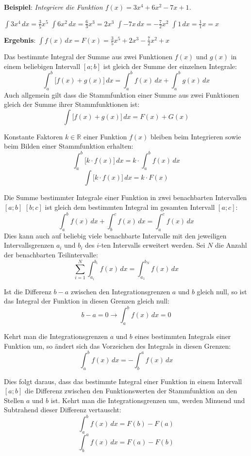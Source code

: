 \textbf{Beispiel}: \emph{Integriere die Funktion $f(x) = 3x^4 + 6x^2 -7x + 1$.}

\begin{center}
	$\int 3x^4 \, dx = \frac{3}{5}x^5$ \hspace{1cm} $\int 6x^2 \, dx = \frac{6}{3}x^3 = 2x^3$ \hspace{1cm} $\int -7x \, dx = -\frac{7}{2}x^2$ \hspace{1cm} $\int 1 \, dx = \frac{1}{1}x = x$
\end{center}

\textbf{Ergebnis}: $\int f(x) \, dx = F(x) = \frac{3}{5}x^5 + 2x^3 -\frac{7}{2}x^2 + x$

\begin{itemize}

	Das bestimmte Integral der Summe aus zwei Funktionen $f(x)$ und $g(x)$ in einem beliebigen Intervall $[a ; b]$ ist gleich der Summe der einzelnen Integrale: $$\int_a^b \big[f(x) + g(x)\big] \,dx = \int_a^b f(x) \, dx + \int_a^b g(x) \, dx$$ Auch allgemein gilt dass die Stammfunktion einer Summe aus zwei Funktionen gleich der Summe ihrer Stammfunktionen ist: $$\int \big[f(x) + g(x)\big]\,dx = F(x) + G(x)$$


	Konstante Faktoren $k \in \mathbb{R}$ einer Funktion $f(x)$ bleiben beim Integrieren sowie beim Bilden einer Stammfunktion erhalten: $$\int_a^b \big[k \cdot f(x)\big] \, dx = k \cdot \int_a^b f(x) \, dx$$ $$\int \big[k \cdot f(x)\big] \, dx = k \cdot F(x)$$


	Die Summe bestimmter Integrale einer Funktion in zwei benachbarten Intervallen $[a ; b]$ $[b ; c]$ ist gleich dem bestimmten Integral im gesamten Intervall $[a ; c]$: $$\int_a^b f(x) \, dx + \int_b^c f(x) \, dx = \int_a^c f(x)\, dx$$ Dies kann auch auf beliebig viele benachbarte Intervalle mit den jeweiligen Intervallsgrenzen $a_i$ und $b_i$ des $i$-ten Intervalls erweitert werden. Sei $N$ die Anzahl der benachbarten Teilintervalle: $$\sum_{i=1}^{N} \int_{a_i}^{b_i} f(x) \, dx = \int_{a_1}^{b_N} f(x) \, dx$$


	Ist die Differenz $b - a$ zwischen den Integrationsgrenzen $a$ und $b$ gleich null, so ist das Integral der Funktion in diesen Grenzen gleich null: $$b - a = 0 \rightarrow \int_{a}^{b} f(x) \, dx = 0$$


	Kehrt man die Integrationsgrenzen $a$ und $b$ eines bestimmten Integrals einer Funktion um, so \"{a}ndert sich das Vorzeichen des Integrals in diesen Grenzen: $$\int_a^b f(x) \, dx = -\int_b^a f(x) \, dx$$

	Dies folgt daraus, dass das bestimmte Integral einer Funktion in einem Intervall $[a ; b]$ die Differenz zwischen den Funktionswerten der Stammfunktion an den Stellen $a$ und $b$ ist. Kehrt man die Integrationsgrenzen um, werden Minuend und Subtrahend dieser Differenz vertauscht: $$\int_a^b f(x) \, dx = F(b) - F(a)$$ $$\int_b^a f(x) \, dx = F(a) - F(b)$$

\end{itemize}


